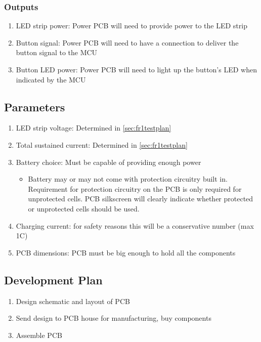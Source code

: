 \documentclass{notes}
\begin{document}
\subsubsection{Outputs}

\begin{enumerate}
    \item LED strip power: Power PCB will need to provide power to the LED strip
    \item Button signal: Power PCB will need to have a connection to deliver the button signal to the MCU
    \item Button LED power: Power PCB will need to light up the button's LED when indicated by the MCU
\end{enumerate}

\subsection{Parameters}

\begin{enumerate}
    \item LED strip voltage: Determined in \autoref{sec:fr1testplan}
    \item Total sustained current: Determined in \autoref{sec:fr1testplan}
    \item Battery choice: Must be capable of providing enough power
    \begin{itemize}
        \item Battery may or may not come with protection circuitry built in.
        Requirement for protection circuitry on the PCB is only required for unprotected cells.
        PCB silkscreen will clearly indicate whether protected or unprotected cells should be used.
    \end{itemize}
    \item Charging current: for safety reasons this will be a conservative number (max 1C)
    \item PCB dimensions: PCB must be big enough to hold all the components
\end{enumerate}

\subsection{Development Plan}

\begin{enumerate}
    \item Design schematic and layout of PCB
    \item Send design to PCB house for manufacturing, buy components
    \item Assemble PCB
\end{enumerate}
\end{document}
